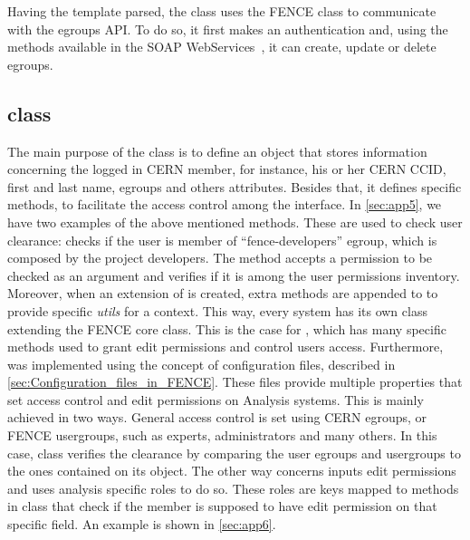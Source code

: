 Having the template parsed, the  class uses the FENCE  class to communicate with the egroups API.
To do so, it first makes an authentication and, using the methods available in the SOAP WebServices~\cite{egroups}, it can create, update or delete egroups.


\subsection{ class}
\label{sec:User_class}

The main purpose of the  class is to define an object that stores information concerning the logged in CERN member, for instance, his or her CERN CCID, first and last name, egroups and others attributes. Besides that, it defines specific methods, to facilitate the access control among the interface. 
In \cref{sec:app5}, we have two examples of the above mentioned methods. These are used to check user clearance:  checks if the user is member of \enquote{fence-developers} egroup, which is composed by the project developers.
The method  accepts a permission to be checked as an argument and verifies if it is among the user permissions inventory.
Moreover, when an extension of  is created, extra methods are appended to  to provide specific \textit{utils} for a context.
This way, every system has its own  class extending the FENCE core  class. 
This is the case for , which has many specific methods used to grant edit permissions and control users access.
Furthermore,  was implemented using the concept of configuration files, described in \cref{sec:Configuration_files_in_FENCE}.
These files provide multiple properties that set access control and edit permissions on Analysis systems. This is mainly achieved in two ways. General access control is set using CERN egroups, or FENCE usergroups, such as experts, administrators and many others.
In this case,  class verifies the clearance by comparing the user egroups and usergroups to the ones contained on its object. The other way concerns inputs edit permissions and uses analysis specific roles to do so.
These roles are keys mapped to methods in  class that check if the member is supposed to have edit permission on that specific field.
An example is shown in \cref{sec:app6}.


